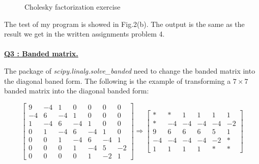 \documentclass{article}
\begin{document}
\begin{figure}[h]
    \centering
    \caption{Cholesky factorization exercise}
    \label{fig2}
\end{figure}
The test of my program is showed in Fig.2(b). The output is the same as the result we get in the written assignments problem 4.\\ \\
\underline{\textbf{Q3 : Banded matrix.\\}}

The package of \emph{scipy.linalg.solve\_banded} need to change the banded matrix into the diagonal baned form.
The following is the example of transforming a $7\times7$ banded matrix into the diagonal banded form:

\[
{\begin{bmatrix}
9 &-4 & 1 &0 &0 &0 &0\\
-4& 6 &-4 &1 &0 &0 &0\\
 1&-4 & 6 &-4&1 &0 &0\\
 0& 1 &-4 & 6&-4&1 &0\\
 0& 0 &  1&-4& 6&-4&1\\
 0& 0 &  0& 1&-4& 5&-2\\
 0& 0 &  0& 0& 1&-2& 1
\end{bmatrix}}
\Rightarrow
{\begin{bmatrix}
* &* &1 &1 &1 &1\\
* &-4&-4&-4&-4&-2\\
9 & 6& 6& 6& 5&1\\
-4&-4&-4&-4&-2&*\\
1 &1 &1 &1 &* &*
\end{bmatrix}}
\]
\end{document}
